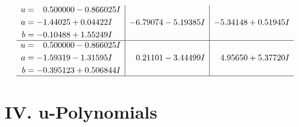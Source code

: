 \documentclass[1p]{elsarticle_modified}
\theoremstyle{definition}
\begin{document}
$$\begin{array}{c|c|c}
\begin{aligned}
u &= \phantom{-}0.500000 - 0.866025 I \\
a &= -1.44025 + 0.04422 I \\
b &= -0.10488 + 1.55249 I\end{aligned}
 & -6.79074 - 5.19385 I & -5.34148 + 0.51945 I \\ \hline\begin{aligned}
u &= \phantom{-}0.500000 - 0.866025 I \\
a &= -1.59319 - 1.31595 I \\
b &= -0.395123 + 0.506844 I\end{aligned}
 & \phantom{-}0.21101 - 3.44499 I & \phantom{-}4.95650 + 5.37720 I\\
 \hline 
 \end{array}$$\newpage
\newpage\renewcommand{\arraystretch}{1}
\centering \section*{ IV. u-Polynomials}
\end{document}
